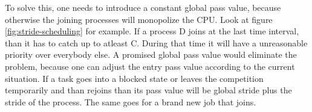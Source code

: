 To solve this, one needs to introduce a constant global pass value, because otherwise the joining processes will monopolize the CPU. 
Look at figure \ref{fig:stride-scheduling} for example.
If a process D joins at the last time interval, than it has to catch up to atleast C. During that time it will have a unreasonable priority over everybody else.
A promised global pass value would eliminate the problem, because one can adjust the entry pass value according to the current situation.
If a task goes into a blocked state or leaves the competition temporarily and than rejoins than its pass value will be global stride plus the stride of the process. The same goes for a brand new job that joins.